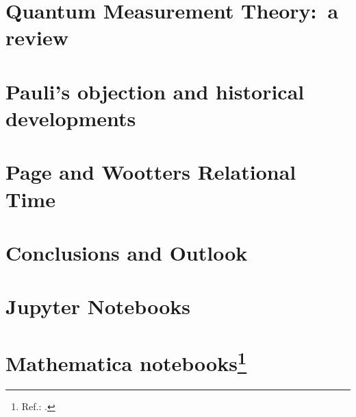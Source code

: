 \chapter{Quantum Measurement Theory:~a review}\label{ch:decohere}





%



\chapter{Pauli's objection and historical developments}\label{ch:hist}



%


\chapter{Page and Wootters Relational Time}\label{ch:pw}\label{ch:detect}









\chapter{Conclusions and Outlook}\label{ch:outlook}




\appendix

\chapter[Jupyter Notebooks]{Jupyter Notebooks}



% 
% 





\chapter[Mathematica notebooks]{Mathematica notebooks\footnote{
  Ref.: \cite{Wolfram}.
}}



\printbibliography[heading=bibintoc]


